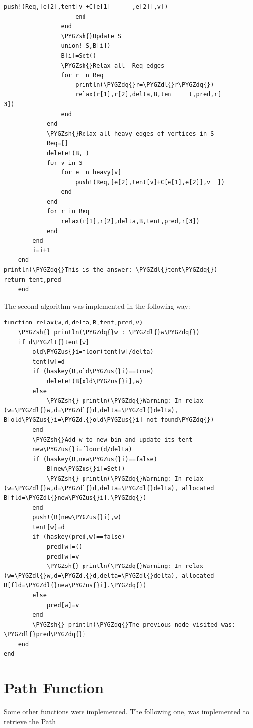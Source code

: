 \documentclass[letterpaper,10pt,english]{sphinxmanual}
\def\PYGZus{\char`\_}
\def\PYGZlt{\char`\<}
\def\PYGZsh{\char`\#}
\def\PYGZdl{\char`\$}
\def\PYGZdq{\char`\"}
\begin{document}
\begin{Verbatim}[commandchars=\\\{\}]
                        push!(Req,[e[2],tent[v]+C[e[1]      ,e[2]],v])
                    end
                end
                \PYGZsh{}Update S
                union!(S,B[i])
                B[i]=Set()
                \PYGZsh{}Relax all  Req edges
                for r in Req
                    println(\PYGZdq{}r=\PYGZdl{}r\PYGZdq{})
                    relax(r[1],r[2],delta,B,ten     t,pred,r[       3])
                end
            end
            \PYGZsh{}Relax all heavy edges of vertices in S
            Req=[]
            delete!(B,i)
            for v in S
                for e in heavy[v]
                    push!(Req,[e[2],tent[v]+C[e[1],e[2]],v  ])
                end
            end
            for r in Req
                relax(r[1],r[2],delta,B,tent,pred,r[3])
            end
        end
        i=i+1
    end
println(\PYGZdq{}This is the answer: \PYGZdl{}tent\PYGZdq{})
return tent,pred
    end
\end{Verbatim}

The second algorithm was implemented in the following way:

\begin{Verbatim}[commandchars=\\\{\}]
function relax(w,d,delta,B,tent,pred,v)
    \PYGZsh{} println(\PYGZdq{}w : \PYGZdl{}w\PYGZdq{})
    if d\PYGZlt{}tent[w]
        old\PYGZus{}i=floor(tent[w]/delta)
        tent[w]=d
        if (haskey(B,old\PYGZus{}i)==true)
            delete!(B[old\PYGZus{}i],w)
        else
            \PYGZsh{} println(\PYGZdq{}Warning: In relax (w=\PYGZdl{}w,d=\PYGZdl{}d,delta=\PYGZdl{}delta), B[old\PYGZus{}i=\PYGZdl{}old\PYGZus{}i] not found\PYGZdq{})
        end
        \PYGZsh{}Add w to new bin and update its tent
        new\PYGZus{}i=floor(d/delta)
        if (haskey(B,new\PYGZus{}i)==false)
            B[new\PYGZus{}i]=Set()
            \PYGZsh{} println(\PYGZdq{}Warning: In relax (w=\PYGZdl{}w,d=\PYGZdl{}d,delta=\PYGZdl{}delta), allocated B[fld=\PYGZdl{}new\PYGZus{}i].\PYGZdq{})
        end
        push!(B[new\PYGZus{}i],w)
        tent[w]=d
        if (haskey(pred,w)==false)
            pred[w]=()
            pred[w]=v
            \PYGZsh{} println(\PYGZdq{}Warning: In relax (w=\PYGZdl{}w,d=\PYGZdl{}d,delta=\PYGZdl{}delta), allocated B[fld=\PYGZdl{}new\PYGZus{}i].\PYGZdq{})
        else
            pred[w]=v
        end
        \PYGZsh{} println(\PYGZdq{}The previous node visited was: \PYGZdl{}pred\PYGZdq{})
    end
end
\end{Verbatim}


\section{Path Function}
\label{Algorithm:path-function}
Some other functions were implemented. The following one, was implemented to retrieve the Path
\end{document}
